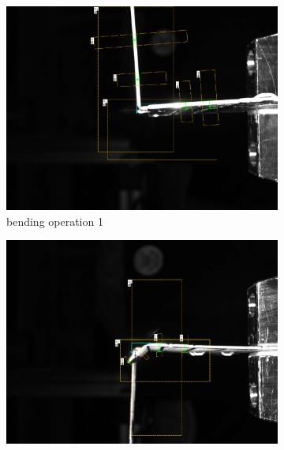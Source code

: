 

\begin{figure}[h]
    \centering
    \begin{subfigure}{0.48\textwidth}
        \centering
        \includegraphics[width=\textwidth]{figures/008_inspection/inpection_1_overlay2.png}
        \caption{bending  operation 1}
        \label{subfig:inspection-1}
        \vspace{0.5cm}
    \end{subfigure}\hspace{0.25cm}
    \begin{subfigure}{0.48\textwidth}
        \centering
        \includegraphics[width=\textwidth]{figures/008_inspection/inspection_2_overlay.png}

\end{subfigure}
\end{figure}
